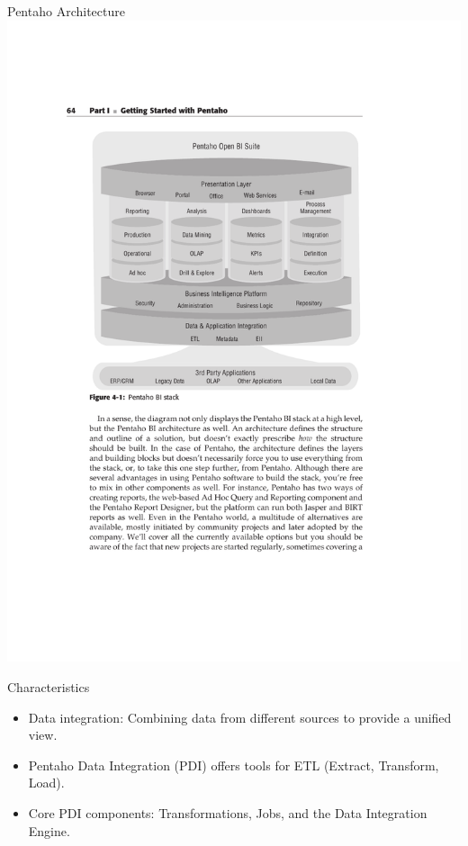 \documentclass[aspectratio=169]{beamer}
\begin{document}
\begin{frame}{Pentaho Architecture}
    \centering
    \includegraphics[width=1.1\textheight, trim={3cm 12.5cm 3cm 5cm}, clip]{figures/pentaho_architecture}
\end{frame}

\begin{frame}{Characteristics}
    \begin{itemize}
        \item Data integration: Combining data from different sources to provide a unified view.
        \item Pentaho Data Integration (PDI) offers tools for ETL (Extract, Transform, Load).
        \item Core PDI components: Transformations, Jobs, and the Data Integration Engine.
    \end{itemize}
\end{frame}
\end{document}
